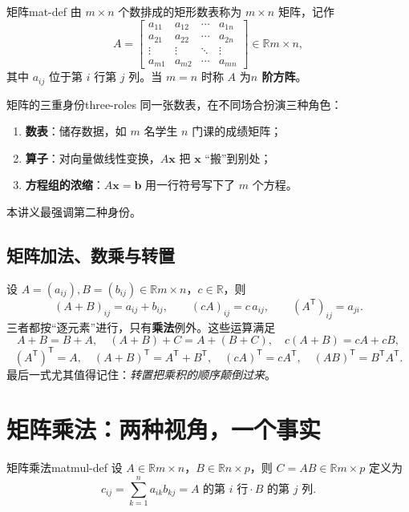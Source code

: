 \documentclass[11pt,a4paper,openany]{ctexbook}
\newcommand{\R}{\mathbb{R}}
\begin{document}
\begin{defn}{矩阵}{mat-def}
由 $m\times n$ 个数排成的矩形数表称为 $m\times n$ 矩阵，记作
\[
A=\begin{bmatrix}
a_{11} & a_{12} & \cdots & a_{1n}\\
a_{21} & a_{22} & \cdots & a_{2n}\\
\vdots & \vdots & \ddots & \vdots\\
a_{m1} & a_{m2} & \cdots & a_{mn}
\end{bmatrix}\in\R{m\times n},
\]
其中 $a_{ij}$ 位于第 $i$ 行第 $j$ 列。当 $m=n$ 时称 $A$ 为\textbf{$n$ 阶方阵}。
\end{defn}

\begin{remk}{矩阵的三重身份}{three-roles}
同一张数表，在不同场合扮演三种角色：
\begin{enumerate}[label=(\arabic*)]
\item \textbf{数表}：储存数据，如 $m$ 名学生 $n$ 门课的成绩矩阵；
\item \textbf{算子}：对向量做线性变换，$A\boldsymbol{x}$ 把 $\boldsymbol{x}$ “搬”到别处；
\item \textbf{方程组的浓缩}：$A\boldsymbol{x}=\boldsymbol{b}$ 用一行符号写下了 $m$ 个方程。
\end{enumerate}
本讲义最强调第二种身份。
\end{remk}

\subsection{矩阵加法、数乘与转置}

设 $A=(a_{ij}),B=(b_{ij})\in\R{m\times n}$，$c\in\R$，则
\[
(A+B)_{ij}=a_{ij}+b_{ij},\qquad (cA)_{ij}=c\,a_{ij},\qquad
(A^{\mathsf T})_{ij}=a_{ji}.
\]
三者都按“逐元素”进行，只有\textbf{乘法}例外。这些运算满足
\[
A+B=B+A,\quad (A+B)+C=A+(B+C),\quad c(A+B)=cA+cB,
\]
\[
(A^{\mathsf T})^{\mathsf T}=A,\quad (A+B)^{\mathsf T}=A^{\mathsf T}+B^{\mathsf T},\quad
(cA)^{\mathsf T}=cA^{\mathsf T},\quad (AB)^{\mathsf T}=B^{\mathsf T}A^{\mathsf T}.
\]
最后一式尤其值得记住：\emph{转置把乘积的顺序颠倒过来}。

\section{矩阵乘法：两种视角，一个事实}

\begin{defn}{矩阵乘法}{matmul-def}
设 $A\in\R{m\times n}$，$B\in\R{n\times p}$，则 $C=AB\in\R{m\times p}$ 定义为
\[
c_{ij}=\sum_{k=1}^{n}a_{ik}b_{kj}
=\text{$A$ 的第 $i$ 行}\cdot\text{$B$ 的第 $j$ 列}.
\]
\end{defn}
\end{document}
